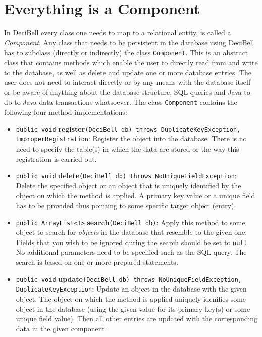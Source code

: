 \documentclass[a4paper,10pt]{article}
\begin{document}
\section*{Everything is a Component}\label{components}
In DeciBell every class one needs to map to a relational entity, is called a \emph{Component}. 
Any class that needs to be persistent in the database using DeciBell has to subclass (directly or indirectly) 
the class \href{http://github.com/hampos/DeciBell/blob/master/src/org/kinkydesign/decibell/Component.java}{\texttt{Component}}. 
This is an abstract class that contains methods which 
enable the user to directly read from and write to the database, 
as well as delete and update one or more database entries. 
The user does not need to interact directly or by any means with the database itself 
or be aware of anything about the database structure, SQL queries and Java-to-db-to-Java data 
transactions whatsoever. The class \texttt{Component} contains the following four
method implementations:

\begin{itemize}

	\item \label{register}\texttt{public void} \textbf{register}\texttt{(DeciBell db) throws DuplicateKeyException, ImproperRegistration}: 
		Register the object into the database. There is no need to specify the table(s) in 
		which the data are stored or the way this registration is carried out.
	\item \label{delete}\texttt{public void} \textbf{delete}\texttt{(DeciBell db) throws NoUniqueFieldException}:
		Delete the specified object or an object that is uniquely identified by the object on which 
		the method is applied. A primary key value or a unique field has to be provided 
		thus pointing to some specific target object (entry).
	\item \label{search}\texttt{public ArrayList<T>} \textbf{search}\texttt{(DeciBell db)}:
		Apply this method to some object to search for \textit{objects} in the database that resemble to the given one.
		Fields that you wish to be ignored during the search should be set to \texttt{null}. No additional parameters
		need to be specified such as the SQL query. The search is based on one or more prepared statements.
	\item \label{update}\texttt{public void} \textbf{update}\texttt{(DeciBell db) throws NoUniqueFieldException, DuplicateKeyException}:
		Update an object in the database with the given object. The object on which the method is applied uniquely
		idenifies some object in the database (using the given value for its primary key(s) or some unique field
		value). Then all other entries are updated with the corresponding data in the given component.		
\end{itemize}
\end{document}
